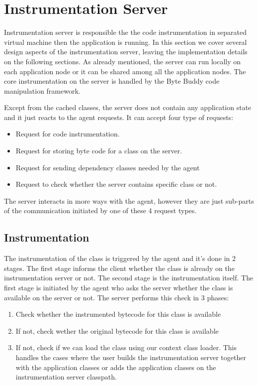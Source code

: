 \section{Instrumentation Server}
\label{sec:inst_server}
Instrumentation server is responsible the the code instrumentation in separated virtual machine then the application is running. In this section we cover several design aspects of the instrumentation server, leaving the implementation details on the following sections. As already mentioned, the server can run locally on each application node or it can be shared among all the application nodes. The core instrumentation on the server is handled by the Byte Buddy code manipulation framework.

Except from the cached classes, the server does not contain any application state and it just reacts to the agent requests. It can accept four type of requests:
\begin{itemize}
	\item Request for code instrumentation.
	\item Request for storing byte code for a class on the server.
	\item Request for sending dependency classes needed by the agent
	\item Request to check whether the server contains specific class or not.
\end{itemize}
The server interacts in more ways with the agent, however they are just sub-parts of the communication initiated by one of these 4 request types.	

\subsection{Instrumentation}
The instrumentation of the class is triggered by the agent and it's done in 2 stages. The first stage informs the client whether the class is already on the instrumentation server or not. The second stage is the instrumentation itself. The first stage is initiated by the agent who asks the server whether the class is available on the server or not. The server performs this check in 3 phases:
\begin{enumerate}
	\item Check whether the instrumented bytecode for this class is available
	\item If not, check wether the original bytecode for this class is available
	\item If not, check if we can load the class using our context class loader. This handles the cases where the user builds the instrumentation server together with the application classes or adds the application classes on the instrumentation server classpath. 
\end{enumerate}

